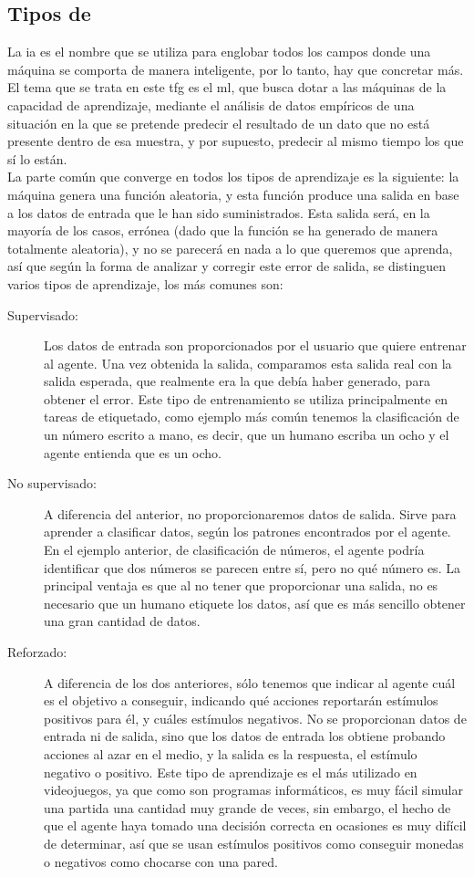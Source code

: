 \subsection{Tipos de  }
La \gls{ia} es el nombre que se utiliza para englobar todos los campos donde una máquina se comporta de manera inteligente, por lo tanto, hay que concretar más. El tema que se trata en este \gls{tfg} es el \gls{ml}, que busca dotar a las máquinas de la capacidad de aprendizaje, mediante el análisis de datos empíricos de una situación en la que se pretende predecir el resultado de un dato que no está presente dentro de esa muestra, y por supuesto, predecir al mismo tiempo los que sí lo están. 
\\
La parte común que converge en todos los tipos de aprendizaje es la siguiente: la máquina genera una función aleatoria, y esta función produce una salida en base a los datos de entrada que le han sido suministrados. Esta salida será, en la mayoría de los casos, errónea (dado que la función se ha generado de manera totalmente aleatoria), y no se parecerá en nada a lo que queremos que aprenda, así que según la forma de analizar y corregir este error de salida, se distinguen varios tipos de aprendizaje, los más comunes son:
\begin{description}
	\item[Supervisado:]  Los datos de entrada son proporcionados por el usuario que quiere entrenar al agente. Una vez obtenida la salida, comparamos esta salida real con la salida esperada, que realmente era la que debía haber generado, para obtener el error. Este tipo de entrenamiento se utiliza principalmente en tareas de etiquetado, como ejemplo más común tenemos la clasificación de un número escrito a mano, es decir, que un humano escriba un ocho y el agente entienda que es un ocho.
	\item[No supervisado:] A diferencia del anterior, no proporcionaremos datos de salida. Sirve para aprender a clasificar datos, según los patrones encontrados por el agente. En el ejemplo anterior, de clasificación de números, el agente podría identificar que dos números se parecen entre sí, pero no qué número es. La principal ventaja es que al no tener que proporcionar una salida, no es necesario que un humano etiquete los datos, así que es más sencillo obtener una gran cantidad de datos.
	\item[Reforzado:] A diferencia de los dos anteriores, sólo tenemos que indicar al agente cuál es el objetivo a conseguir, indicando qué acciones reportarán estímulos positivos para él, y cuáles estímulos negativos. No se proporcionan datos de entrada ni de salida, sino que los datos de entrada los obtiene probando acciones al azar en el medio, y la salida es la respuesta, el estímulo negativo o positivo.  Este tipo de aprendizaje es el más utilizado en videojuegos, ya que como son programas informáticos, es muy fácil simular una partida una cantidad muy grande de veces, sin embargo, el hecho de que el agente haya tomado una decisión correcta en ocasiones es muy difícil de determinar, así que se usan estímulos positivos como conseguir monedas o negativos como chocarse con una pared.
\end{description}

